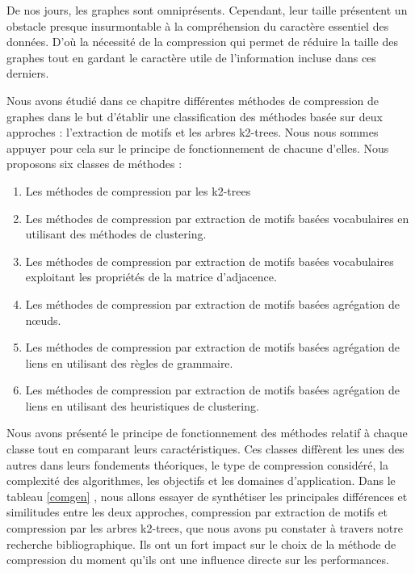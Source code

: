 De nos jours, les graphes sont omniprésents. Cependant, leur taille présentent un obstacle presque insurmontable à la compréhension du caractère essentiel des données. D'où la nécessité de la compression qui permet de réduire la taille des graphes tout en gardant le caractère utile de l'information incluse dans ces derniers.

Nous avons étudié dans ce chapitre différentes méthodes de compression de graphes dans le but d'établir une classification des méthodes basée sur deux approches : l'extraction de motifs et les arbres k2-trees. Nous nous sommes appuyer pour cela sur le principe de fonctionnement de chacune d'elles. Nous  proposons six classes de méthodes :

\begin{enumerate}[label=\roman*]
\item  Les méthodes de compression par les k2-trees
	\item  Les méthodes de compression par extraction de motifs basées vocabulaires en utilisant des méthodes de clustering.
	\item  Les méthodes de compression par extraction de motifs basées vocabulaires exploitant les propriétés de la matrice d'adjacence.
	\item  Les méthodes de compression par extraction de motifs basées agrégation de nœuds.
	\item  Les méthodes de compression par extraction de motifs basées agrégation de liens en utilisant des règles de grammaire.
	\item  Les méthodes de compression par extraction de motifs basées agrégation de liens en utilisant des heuristiques de clustering.
\end{enumerate}
	
Nous avons présenté le principe de fonctionnement des méthodes relatif à chaque classe tout en comparant leurs caractéristiques. 
 Ces classes diffèrent les unes des autres dans leurs fondements théoriques, le type de compression considéré, la complexité des algorithmes, les objectifs et les domaines d'application. 
 Dans le tableau \ref{comgen} , nous allons essayer de synthétiser les principales différences et similitudes entre les deux approches, compression par extraction de motifs et compression par les arbres k2-trees, que nous avons pu constater à travers notre recherche bibliographique. Ils ont un fort impact sur le choix de la méthode de compression du moment qu'ils ont une influence directe sur les performances.
 
